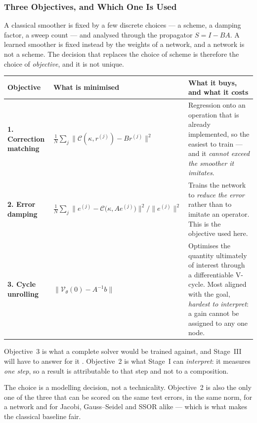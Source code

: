 \frametitle{Three Objectives, and Which One Is Used}
\footnotesize

A classical smoother is fixed by a few discrete choices --- a scheme, a damping factor, a
sweep count --- and analysed through the propagator $S=I-BA$. A learned smoother is fixed
instead by the weights of a network, and a network is not a scheme. The decision that
replaces the choice of scheme is therefore the choice of \emph{objective}, and it is not
unique.

\vspace{1.5mm}
\begin{tabular}{@{}p{3.5cm}p{7.1cm}p{13.2cm}@{}}
\toprule
Objective & What is minimised & What it buys, and what it costs \\
\midrule
\textbf{1. Correction matching} &
$\frac1N\sum_j\bigl\|\mathcal{C}(\kappa,r^{(j)})-Br^{(j)}\bigr\|^2$ &
Regression onto an operation that is already implemented, so the easiest to train --- and
it \emph{cannot exceed the smoother it imitates}. \\[3pt]
\textbf{2. Error damping} &
$\frac1N\sum_j\bigl\|e^{(j)}-\mathcal{C}\bigl(\kappa,Ae^{(j)}\bigr)\bigr\|^2
 \big/ \bigl\|e^{(j)}\bigr\|^2$ &
Trains the network to \emph{reduce the error} rather than to imitate an operator.
\alert{This is the objective used here.} \\[3pt]
\textbf{3. Cycle unrolling} &
$\bigl\|\mathcal{V}_\theta(0)-A^{-1}b\bigr\|$ &
Optimises the quantity ultimately of interest through a differentiable V-cycle. Most
aligned with the goal, \emph{hardest to interpret}: a gain cannot be assigned to any one
node. \\
\bottomrule
\end{tabular}

\vspace{2mm}
Objective~3 is what a complete solver would be trained against, and Stage~III will have to
answer for it \cite{huang2021learning}. Objective~2 is what Stage~I can \emph{interpret}:
it measures \emph{one step}, so a result is attributable to that step and not to a
composition.

\bre
The choice is a modelling decision, not a technicality. Objective~2 is also the only one of
the three that can be scored on the same test errors, in the same norm, for a network and
for Jacobi, Gauss--Seidel and SSOR alike --- which is what makes the classical baseline
fair.
\ere
